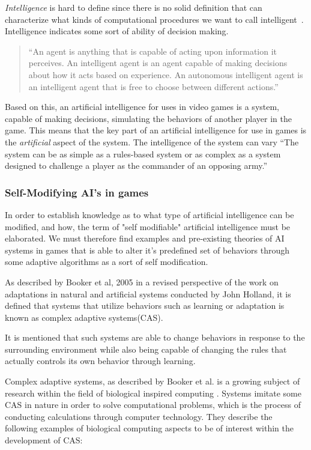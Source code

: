 \emph{Intelligence} is hard to define since there is no solid definition that can characterize what kinds of computational procedures we want to call intelligent~\cite{McCarthy2007}. Intelligence indicates some sort of ability of decision making.

\blockquote[{\autocite{Mills2005}}]{\enquote{An agent is anything that is capable of acting upon information it perceives. An intelligent agent is an agent capable of making decisions about how it acts based on experience. An autonomous intelligent agent is an intelligent agent that is free to choose between different actions.}}

Based on this, an artificial intelligence for uses in video games is a system, capable of making decisions, simulating the behaviors of another player in the game.
This means that the key part of an artificial intelligence for use in games is the \emph{artificial} aspect of the system. The intelligence of the system can vary \enquote{The system can be as simple as a rules-based system or as complex as a system designed to challenge a player as the commander of an opposing army.}\autocite{Kehoe2009}


\subsubsection{Self-Modifying AI's in games}\label{sec:selfmodifyingai}

In order to establish knowledge as to what type of artificial intelligence can be modified, and how, the term of "self modifiable" artificial intelligence must be elaborated. We must therefore find examples and pre-existing theories of AI systems in games that is able to alter it's predefined set of behaviors through some adaptive algorithms as a sort of self modification.

As described by Booker et al, 2005 \cite{Booker2005} in a revised perspective of the work on adaptations in natural and artificial systems conducted by John Holland, it is defined that systems that utilize behaviors such as learning or adaptation is known as complex adaptive systems(CAS).\cite[pp. 1]{Booker2005}

It is mentioned that such systems are able to change behaviors in response to the surrounding environment while also being capable of changing the rules that actually controls its own behavior through learning.

Complex adaptive systems, as described by Booker et al. is a growing subject of research within the field of biological inspired computing\cite{Booker2005} . Systems imitate some CAS in nature in order to solve computational problems, which is the process of conducting calculations through computer technology. They describe the following examples of biological computing aspects to be of interest within the development of CAS:

